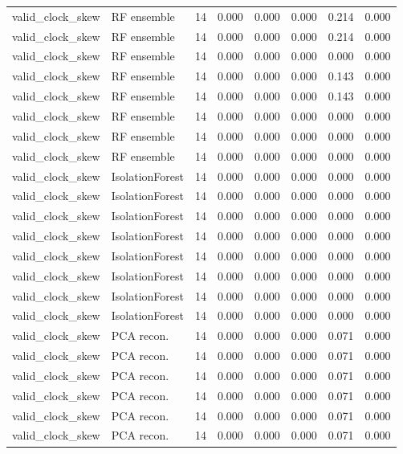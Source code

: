 {\begin{longtable}{llrrrrrr}
valid\_clock\_skew & RF ensemble & 14 & 0.000 & 0.000 & 0.000 & 0.214 & 0.000 \\
valid\_clock\_skew & RF ensemble & 14 & 0.000 & 0.000 & 0.000 & 0.214 & 0.000 \\
valid\_clock\_skew & RF ensemble & 14 & 0.000 & 0.000 & 0.000 & 0.000 & 0.000 \\
valid\_clock\_skew & RF ensemble & 14 & 0.000 & 0.000 & 0.000 & 0.143 & 0.000 \\
valid\_clock\_skew & RF ensemble & 14 & 0.000 & 0.000 & 0.000 & 0.143 & 0.000 \\
valid\_clock\_skew & RF ensemble & 14 & 0.000 & 0.000 & 0.000 & 0.000 & 0.000 \\
valid\_clock\_skew & RF ensemble & 14 & 0.000 & 0.000 & 0.000 & 0.000 & 0.000 \\
valid\_clock\_skew & RF ensemble & 14 & 0.000 & 0.000 & 0.000 & 0.000 & 0.000 \\
valid\_clock\_skew & IsolationForest & 14 & 0.000 & 0.000 & 0.000 & 0.000 & 0.000 \\
valid\_clock\_skew & IsolationForest & 14 & 0.000 & 0.000 & 0.000 & 0.000 & 0.000 \\
valid\_clock\_skew & IsolationForest & 14 & 0.000 & 0.000 & 0.000 & 0.000 & 0.000 \\
valid\_clock\_skew & IsolationForest & 14 & 0.000 & 0.000 & 0.000 & 0.000 & 0.000 \\
valid\_clock\_skew & IsolationForest & 14 & 0.000 & 0.000 & 0.000 & 0.000 & 0.000 \\
valid\_clock\_skew & IsolationForest & 14 & 0.000 & 0.000 & 0.000 & 0.000 & 0.000 \\
valid\_clock\_skew & IsolationForest & 14 & 0.000 & 0.000 & 0.000 & 0.000 & 0.000 \\
valid\_clock\_skew & IsolationForest & 14 & 0.000 & 0.000 & 0.000 & 0.000 & 0.000 \\
valid\_clock\_skew & PCA recon. & 14 & 0.000 & 0.000 & 0.000 & 0.071 & 0.000 \\
valid\_clock\_skew & PCA recon. & 14 & 0.000 & 0.000 & 0.000 & 0.071 & 0.000 \\
valid\_clock\_skew & PCA recon. & 14 & 0.000 & 0.000 & 0.000 & 0.071 & 0.000 \\
valid\_clock\_skew & PCA recon. & 14 & 0.000 & 0.000 & 0.000 & 0.071 & 0.000 \\
valid\_clock\_skew & PCA recon. & 14 & 0.000 & 0.000 & 0.000 & 0.071 & 0.000 \\
valid\_clock\_skew & PCA recon. & 14 & 0.000 & 0.000 & 0.000 & 0.071 & 0.000 \\

\end{longtable}}
